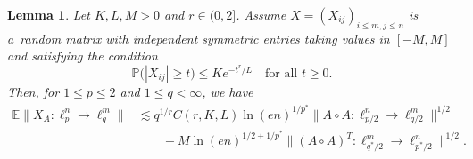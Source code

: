 \documentclass[a4paper]{amsart}
\newtheorem{lemma}[theorem]{Lemma}
\theoremstyle{definition}
\theoremstyle{remark}
\numberwithin{equation}{section}
\newcommand*{\EE}{\mathbb{E}}
\newcommand*{\PP}{\mathbb{P}}
\newcommand*{\hadprod}{\mathbin{\circ}} %
\begin{document}
\begin{lemma}
	\label{prop:bounded-p-smaller-2}
	Let $K,L, M>0$ and $r\in(0,2]$.
	Assume $X=(X_{ij})_{i\leq m, j\leq n}$ is a~random matrix
	with independent symmetric entries taking values in $[-M,M]$
	and satisfying the condition
	\begin{equation}	\label{eq:prop-assumption-lin-psi}
	\PP\bigl(|X_{ij}| \ge t\bigr) \le Ke^{-t^r/L} \quad \text{for all } t\ge 0.
	\end{equation}
		Then, for $1\leq p\leq 2$ and $1\leq q< \infty$, we have
\begin{align*}
\EE \|X_A \colon \ell^n_p\to \ell^m_q\|
& \lesssim q^{1/r} C(r,K,L) \ln(en)^{1/p^*} \|A\hadprod A \colon \ell^n_{p/2} \to \ell^m_{q/2}\|^{1/2}\\
 &\qquad + M \ln(en)^{1/2+1/p^*}  \|(A\hadprod A)^T \colon \ell^m_{q^*/2} \to \ell^n_{p^*/2}\|^{1/2}. \nonumber
 \end{align*}
\end{lemma}
\end{document}
